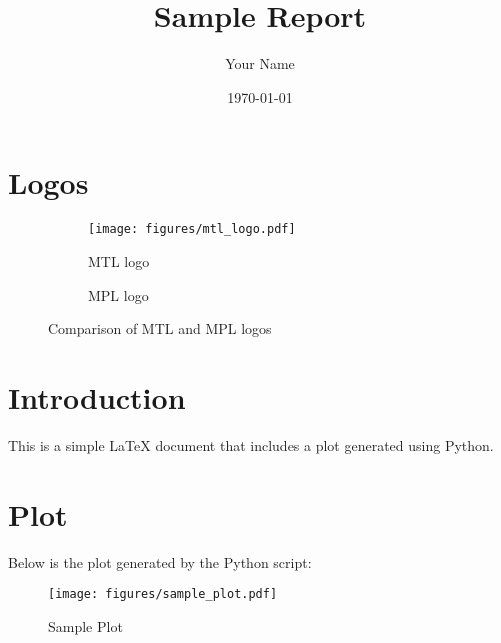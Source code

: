 \documentclass{article}
\title{Sample Report}
\author{Your Name}
\date{\today}
\begin{document}
\maketitle

\section{Logos}
\begin{figure}[h!]
    \centering
    \begin{subfigure}{0.45\textwidth}
        \centering
        \texttt{[image: figures/mtl\_logo.pdf]}
        \caption{MTL logo}
    \end{subfigure}
    \hfill
    \begin{subfigure}{0.45\textwidth}
        \centering
        
        \caption{MPL logo}
    \end{subfigure}
    \caption{Comparison of MTL and MPL logos}
\end{figure}

\section{Introduction}
This is a simple LaTeX document that includes a plot generated using Python.

\section{Plot}
Below is the plot generated by the Python script:

\begin{figure}[h!]
    \centering
    \texttt{[image: figures/sample\_plot.pdf]}
    \caption{Sample Plot}
\end{figure}
\end{document}
